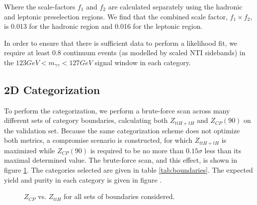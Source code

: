 Where the scale-factors $f_{1}$ and $f_{2}$ are calculated separately using the hadronic and leptonic preselection regions. We find that the combined scale factor, $f_{1} \times f_{2}$, is 0.013 for the hadronic region and 0.016 for the leptonic region. 

In order to ensure that there is sufficient data to perform a likelihood fit, we require at least 0.8 continuum events (as modelled by scaled NTI sidebands) in the $123 GeV < m_{\gamma\gamma} < 127 GeV$ signal window in each category.

\subsection{2D Categorization}

To perform the categorization, we perform a brute-force scan across many different sets of category boundaries, calculating both $Z_{ttH+tH}$ and $Z_{CP}(90)$ on the validation set. Because the same categorization scheme does not optimize both metrics, a compromise scenario is constructed, for which $Z_{ttH+tH}$ is maximized while $Z_{CP}(90)$ is required to be no more than $0.15\sigma$ less than its maximal determined value. The brute-force scan, and this effect, is shown in figure \ref{fig:optimal}. The categories selected are given in table \ref{tab:boundaries}. The expected yield and purity in each category is given in figure .

\begin{figure}[htbp]
 \centering
  \caption{$Z_{CP}$ vs. $Z_{ttH}$ for all sets of boundaries considered.}
  \label{fig:optimal}
\end{figure}

